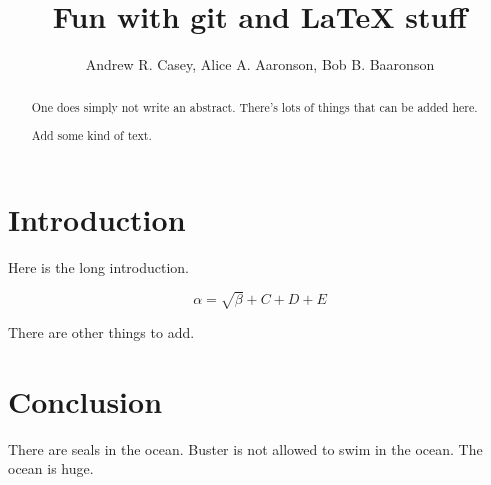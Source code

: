 \documentclass{article}
\begin{document}
\title{Fun with git and \LaTeX{} stuff}
\author{Andrew R. Casey, Alice A. Aaronson, Bob B. Baaronson}

\maketitle

\begin{abstract}
One does simply not write an abstract. There's lots of things that can be added here.

Add some kind of text.
\end{abstract}

\section{Introduction}
Here is the long introduction.

\begin{equation}
    \label{simple_equation}
    \alpha = \sqrt{ \beta } + C + D + E
\end{equation}

There are other things to add.

\section{Conclusion}
There are seals in the ocean. Buster is not allowed to swim in the ocean. The ocean is huge.
\end{document}
